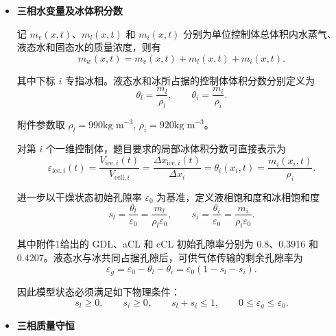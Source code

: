 \documentclass[bwprint]{gmcmthesis}
\numberwithin{figure}{section}
\begin{document}
\begin{itemize}
\renewcommand{\labelitemi}{$\blacktriangleright$}
\item \textbf {三相水变量及冰体积分数}

 记 \(m_v(x,t)\)、\(m_l(x,t)\) 和 \(m_i(x,t)\) 分别为单位控制体总体积内水蒸气、液态水和固态水的质量浓度，则有
\begin{equation}
m_w(x,t) = m_v(x,t) + m_l(x,t) + m_i(x,t). 
\tag{4-11}
\end{equation}

 其中下标 \(i\) 专指冰相。液态水和冰所占据的控制体体积分数分别定义为
\begin{equation}
\theta_l = \frac{m_l}{\rho_l}, \qquad \theta_i = \frac{m_i}{\rho_i}.
\tag{4-12}
\end{equation}

 附件参数取 $\rho_l = 990\text{kg m}^{-3}$,  $\rho_i = 920\text{kg m}^{-3}$。

 对第 \(i\) 个一维控制体，题目要求的局部冰体积分数可直接表示为
\begin{equation}
\varepsilon_{\text{ice},i}(t) = \frac{V_{\text{ice},i}(t)}{V_{\text{cell},i}} = \frac{\Delta x_{\text{ice},i}(t)}{\Delta x_i} = \theta_i(x_i, t) = \frac{m_i(x_i, t)}{\rho_i}. 
\tag{4-13}
\end{equation}


 进一步以干燥状态初始孔隙率 \(\varepsilon_0\) 为基准，定义液相饱和度和冰相饱和度
\begin{equation}
s_l = \frac{\theta_l}{\varepsilon_0} = \frac{m_l}{\rho_l \varepsilon_0}, \qquad s_i = \frac{\theta_i}{\varepsilon_0} = \frac{m_i}{\rho_i \varepsilon_0}. 
\tag{4-14}
\end{equation}

 其中附件1给出的 GDL、aCL 和 cCL 初始孔隙率分别为 0.8、0.3916 和 0.4207。液态水与冰共同占据孔隙后，可供气体传输的剩余孔隙率为
\begin{equation}
\varepsilon_g = \varepsilon_0 - \theta_l - \theta_i = \varepsilon_0(1 - s_l - s_i).
 \tag{4-15}
\end{equation}

 因此模型状态必须满足如下物理条件：
\begin{equation}
s_l \geq 0, \qquad s_i \geq 0, \qquad s_l + s_i \leq 1, \qquad 0 \leq \varepsilon_g \leq \varepsilon_0. 
\tag{4-16}
\end{equation}



\item \textbf {三相质量守恒}


\end{itemize}
\end{document}
